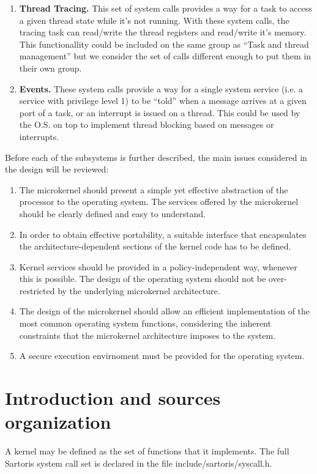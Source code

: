\documentclass[11pt, letterpaper, twoside, english]{book}
\begin{document}
\begin{enumerate}
\item[]\textbf{Thread Tracing.} This set of system calls provides a way for a task to access a given thread state while it's not running. With these system calls, the tracing task can read/write the thread registers and read/write it's memory. This functionallity could be included on the same group as "`Task and thread management"' but we consider the set of calls different enough to put them in their own group.
\item[]\textbf{Events.} These system calls provide a way for a single system service (i.e. a service with privilege level 1) to be "`told"' when a message arrives at a given port of a task, or an interrupt is issued on a thread. This could be used by the O.S. on top to implement thread blocking based on messages or interrupts.
\end{enumerate}

\noindent{}Before each of the subsystems is further described, the main issues considered in the design will be reviewed:
\begin{enumerate}
\item[] The microkernel should present a simple yet effective abstraction of the processor to the operating system. The services offered by the microkernel should be clearly defined and easy to understand.
\item[] In order to obtain effective portability, a suitable interface that encapsulates the architecture-dependent sections of the kernel code has to be defined.
\item[] Kernel services should be provided in a policy-independent way, whenever this is possible. The design of the operating system should not be over-restricted by the underlying microkernel architecture.
\item[] The design of the microkernel should allow an efficient implementation of the most common operating system functions, considering the inherent constraints that the microkernel architecture imposes to the system.
\item[] A secure execution envirnoment must be provided for the operating system.
\end{enumerate}

\section{Introduction and sources organization}
A kernel may be defined as the set of functions that it implements. The full Sartoris system call set is declared in the file \textsf{include/sartoris/syscall.h}.
\end{document}
